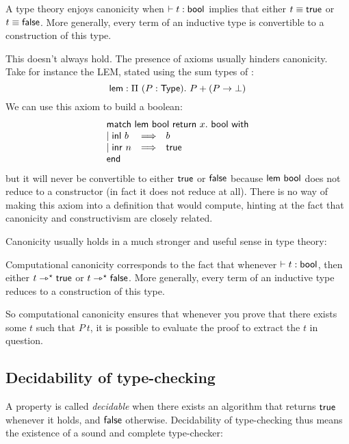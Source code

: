 \begin{definition}[Canonicity]
  A type theory enjoys canonicity when \(\vdash t : \mathsf{bool}\) implies that
  either \(t \equiv \mathsf{true}\) or \(t \equiv \mathsf{false}\).
  More generally, every term of an inductive type is convertible to a
  construction of this type.
\end{definition}

This doesn't always hold. The presence of axioms usually hinders canonicity.
Take for instance the \acrshort{LEM}, stated using the sum types of
:
%
\[
  \mathsf{lem} : \Pi\ (P : \mathsf{Type}).\ P + (P \to \bot)
\]
We can use this axiom to build a boolean:
\[
  \pmatch{\mathsf{lem}\ \bool}{x.\ \bool}{
    \branch{\inl\ b}{b} \\
    \branch{\inr\ n}{\ttrue}
  }
\]
but it will never be convertible to either \(\mathsf{true}\) or \(\mathsf{false}\) because
\(\mathsf{lem}\ \mathsf{bool}\) does not reduce to a constructor (in fact it does not
reduce at all).
There is no way of making this axiom into a definition that would compute,
hinting at the fact that canonicity and constructivism are closely related.

Canonicity usually holds in a much stronger and useful sense in type theory:

\begin{definition}
  Computational canonicity corresponds to the fact that whenever
  \(\vdash t : \mathsf{bool}\), then either \(t \rightarrowtriangle^{\star} \mathsf{true}\) or
  \(t \rightarrowtriangle^{\star} \mathsf{false}\).
  More generally, every term of an inductive type reduces to a construction
  of this type.
\end{definition}

So computational canonicity ensures that whenever you prove that there exists
some \(t\) such that \(P\ t\), it is possible to evaluate the proof to extract
the \(t\) in question.

\subsection{Decidability of type-checking}

A property is called \emph{decidable} when there exists an algorithm that
returns \(\mathsf{true}\) whenever it holds, and \(\mathsf{false}\) otherwise.
Decidability of type-checking thus means the existence of a sound and complete
type-checker:

